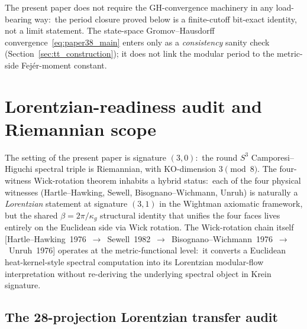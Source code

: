 \documentclass[11pt,a4paper]{article}
\theoremstyle{plain}
\theoremstyle{definition}
\newcommand{\sthree}{S^{3}}
\begin{document}
The present paper does not require the GH-convergence machinery in any
load-bearing way:\ the period closure proved below is a
finite-cutoff bit-exact identity, not a limit statement. The
state-space Gromov--Hausdorff convergence~\eqref{eq:paper38_main}
enters only as a
\emph{consistency} sanity check (Section~\ref{sec:tt_construction});
it does not link the modular period to the metric-side Fej\'er-moment constant.

\section{Lorentzian-readiness audit and Riemannian scope}
\label{sec:lorentzian_readiness}

The setting of the present paper is signature $(3, 0)$:\ the round
$\sthree$ Camporesi--Higuchi spectral triple is Riemannian, with
KO-dimension $3 \pmod 8$. The four-witness Wick-rotation theorem
inhabits a hybrid status:\ each of the four physical witnesses
(Hartle--Hawking, Sewell, Bisognano--Wichmann, Unruh) is naturally a
\emph{Lorentzian} statement at signature $(3, 1)$ in the Wightman
axiomatic framework, but the shared $\beta = 2\pi / \kappa_g$ structural
identity that unifies the four faces lives entirely on the Euclidean
side via Wick rotation. The Wick-rotation chain itself
[Hartle--Hawking~1976~$\to$~Sewell~1982~$\to$~Bisognano--Wichmann~1976~$\to$~Unruh~1976]
operates at the metric-functional level:\ it converts a Euclidean
heat-kernel-style spectral computation into its Lorentzian
modular-flow interpretation without re-deriving the underlying
spectral object in Krein signature.

\subsection{The 28-projection Lorentzian transfer audit}
\label{sec:l0_audit}
\end{document}
